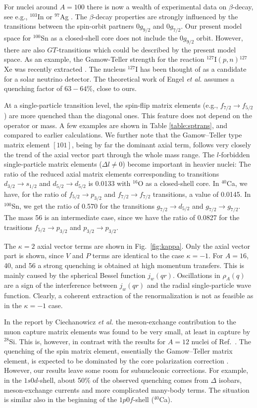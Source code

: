 For nuclei around $A=100$ there is now a wealth of experimental data
on $\beta$-decay, see e.g., $^{103}$In \cite{in103} or $^{97}$Ag
\cite{ag97}. The $\beta$-decay properties are strongly influenced by the 
transitions between the spin-orbit partners $0g_{9/2}$ and $0g_{7/2}$.
Our present model space for $^{100}$Sn as a closed-shell core does not include
the $0g_{9/2}$ orbit. However, there are also $GT$-transitions which could 
be described by the present model space. As an example, the Gamow-Teller
strength for the reaction $^{127}$I$(p,n)$$^{127}$Xe was recently 
extracted \cite{i127}. The nucleus $^{127}$I has been thought of as
a candidate for a solar neutrino detector. The theoretical work of Engel {\em et al.} \cite{engel94} assumes a quenching factor of $63-64\%$, close to ours.  

 
At a single-particle transition level, the spin-flip matrix elements (e.g.,
$f_{7/2}\to f_{5/2}$) are more quenched than the diagonal 
ones. This feature does not depend on the operator or mass. 
A few examples are shown in Table \ref{table:sptrans}, and compared
to earlier calculations. We further note 
that the Gamow--Teller type matrix element $[101]$, being by
far the dominant axial term, follows very closely the trend of the axial
vector part through the whole mass range.
The $l$-forbidden single-particle matrix elements ($\Delta l \ne 0$) 
become important in heavier nuclei: The
ratio of the reduced axial matrix elements corresponding to transitions
$d_{3/2}\to s_{1/2}$ and $d_{5/2}\to d_{5/2}$ is 0.0133 with $^{16}$O as a
closed-shell core. In $^{40}$Ca, we have, for the ratio of $f_{5/2}\to 
p_{3/2}$ and $f_{7/2}\to f_{7/2}$ transitions, a value of 0.0145. In 
$^{100}$Sn, we get the ratio of 0.570 for the transitions $g_{7/2}\to
d_{5/2}$ and $g_{7/2}\to g_{7/2}$. The mass 56 is an intermediate case,
since we have the ratio of 0.0827 for the trasitions $f_{5/2}\to p_{3/2}$
and $p_{3/2}\to p_{3/2}$. 

The $\kappa=2$ axial vector terms are shown in Fig.\ \ref{fig:kappa}. Only
the axial vector part is shown, since $V$ and $P$ terms are identical to
the case $\kappa=-1$. For $A=16$, 40, and 56 a strong quenching is obtained 
at high momentum transfers. This
is mainly caused by the spherical Bessel function $j_w(qr)$. Oscillations
in $\rho_A(q)$ are a sign of the interference between $j_w(qr)$ and the 
radial single-particle wave function. Clearly, a coherent extraction of
the renormalization is not as feasible as in the $\kappa=-1$ case.

In the report by Ciechanowicz {\em et al.} \cite{cie98}
the meson-exchange contribution to the muon capture matrix elements
was found to be very small, at least in capture by $^{28}$Si. This is,
however, in contrast with the results for $A=12$ nuclei of Ref.\
\cite{gui82}. The quenching of the spin matrix element,
essentially the Gamow--Teller matrix element, is expected to be
dominated by the core polarization correction \cite{tow87}. 
However, our results leave some room for subnucleonic
corrections. For example, in the $1s0d$-shell, about 50\% of the observed quenching
\cite{bro88} comes from $\Delta$ isobars, meson-exchange currents and
more complicated many-body terms. The situation is similar also in the 
beginning of the $1p0f$-shell ($^{40}$Ca).

